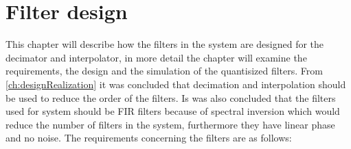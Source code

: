 \chapter{Filter design}
This chapter will describe how the filters in the system are designed for the decimator and interpolator, in more detail the chapter will examine the requirements, the design and the simulation of the quantisized filters. From \autoref{ch:designRealization} it was concluded that decimation and interpolation should be used to reduce the order of the filters.  
Is was also concluded that the filters used for system should be FIR filters because of spectral inversion which would reduce the number of filters in the system, furthermore they have linear phase and no noise. The requirements concerning the filters are as follows:   
\vspace{-2mm}





%

%

%